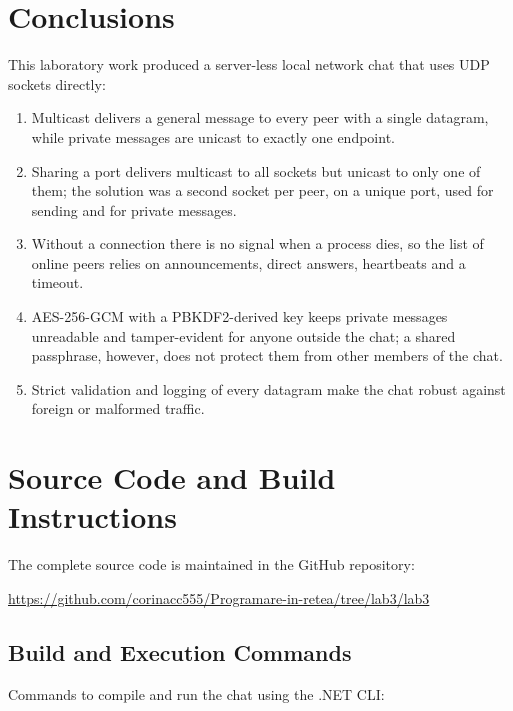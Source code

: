 \documentclass[11pt, a4paper]{article}
\begin{document}
\section{Conclusions}
This laboratory work produced a server-less local network chat that uses UDP sockets directly:
\begin{enumerate}
    \item Multicast delivers a general message to every peer with a single datagram, while private messages are unicast to exactly one endpoint.
    \item Sharing a port delivers multicast to all sockets but unicast to only one of them; the solution was a second socket per peer, on a unique port, used for sending and for private messages.
    \item Without a connection there is no signal when a process dies, so the list of online peers relies on announcements, direct answers, heartbeats and a timeout.
    \item AES-256-GCM with a PBKDF2-derived key keeps private messages unreadable and tamper-evident for anyone outside the chat; a shared passphrase, however, does not protect them from other members of the chat.
    \item Strict validation and logging of every datagram make the chat robust against foreign or malformed traffic.
\end{enumerate}

\section{Source Code and Build Instructions}
The complete source code is maintained in the GitHub repository:
\begin{center}
\url{https://github.com/corinacc555/Programare-in-retea/tree/lab3/lab3}
\end{center}

\subsection{Build and Execution Commands}
Commands to compile and run the chat using the .NET CLI:
\end{document}

